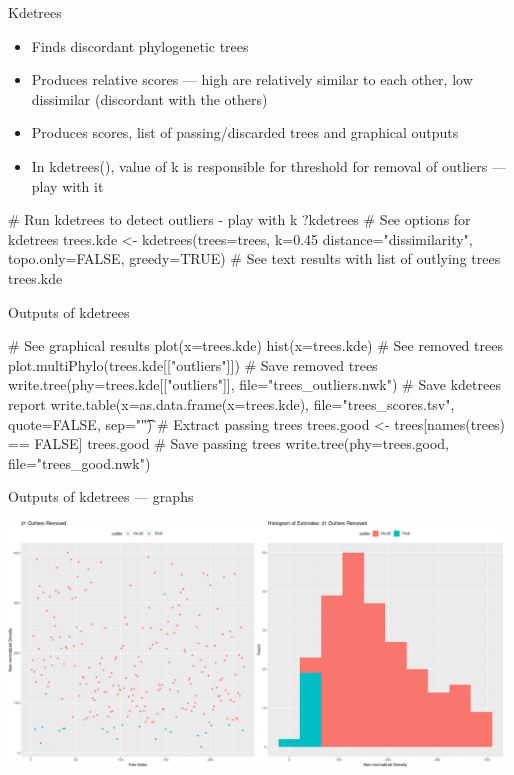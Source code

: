 \documentclass[compress, ucs, xelatex, 11pt, xcolor=x11names, aspectratio=169,
	hyperref={
		bookmarks=true,
		unicode=true,
		colorlinks=true,
		pdftitle={HybSeq course},
		plainpages=false,
		pdfauthor={Vojtech Zeisek},
		pdfsubject={Practical processing of HybSeq target enrichment sequencing data on computing grids like MetaCentrum},
		pdfcreator={XeLaTeX},
		pdfkeywords={BASH, command line, GNU, HybSeq, Linux, MetaCentrum, sequencing shell, target enrichment},
		linkcolor=Turquoise4, %
		anchorcolor=DodgerBlue4, %
		citecolor=DodgerBlue4, %
		filecolor=DodgerBlue4, %
		menucolor=Tan4, %
		urlcolor=DarkOliveGreen4, %
		pdftex},
	url={hyphens, lowtilde} %
	]{beamer}
\renewcommand{\texttt}[1]{\colorbox{Cornsilk2}{{\ttfamily #1}}}
\renewcommand{\alert}[1]{\textcolor{OrangeRed3}{#1}}
\begin{document}
\begin{frame}[fragile]{Kdetrees}
	\begin{itemize}
		\item Finds discordant phylogenetic trees
		\item Produces relative scores --- high are relatively similar to each other, low dissimilar (discordant with the others)
		\item Produces scores, list of passing/discarded trees and graphical outputs
		\item In \texttt{kdetrees()}, \alert{value of \texttt{k} is responsible for threshold for removal of outliers --- play with it}
	\end{itemize}
	\begin{spluscode}
    # Run kdetrees to detect outliers - play with k
    ?kdetrees # See options for kdetrees
    trees.kde <- kdetrees(trees=trees, k=0.45 distance="dissimilarity",
      topo.only=FALSE, greedy=TRUE)
    # See text results with list of outlying trees
    trees.kde
	\end{spluscode}
\end{frame}

\begin{frame}[fragile]{Outputs of kdetrees}
	\begin{spluscode}
    # See graphical results
    plot(x=trees.kde)
    hist(x=trees.kde)
    # See removed trees
    plot.multiPhylo(trees.kde[["outliers"]])
    # Save removed trees
    write.tree(phy=trees.kde[["outliers"]], file="trees_outliers.nwk")
    # Save kdetrees report
    write.table(x=as.data.frame(x=trees.kde), file="trees_scores.tsv",
      quote=FALSE, sep="\t")
    # Extract passing trees
    trees.good <- trees[names(trees) %
      == FALSE]
    trees.good
    # Save passing trees
    write.tree(phy=trees.good, file="trees_good.nwk")
	\end{spluscode}
\end{frame}

\begin{frame}{Outputs of kdetrees --- graphs}
	\begin{center}
		\includegraphics[height=6.5cm]{kdetrees.png}
	\end{center}
\end{frame}
\end{document}
